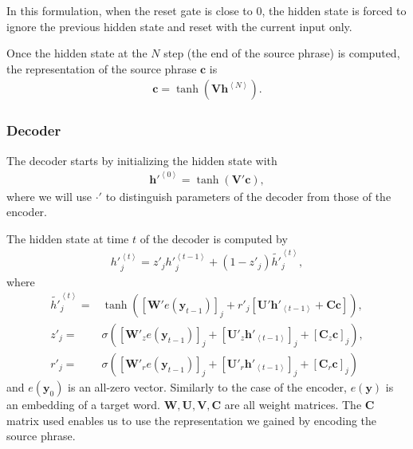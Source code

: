 \documentclass[a4paper]{article}
\newcommand{\qt}[1]{\left<#1\right>}
\newcommand{\vect}[1]{\mathbf{#1}}
\newcommand{\matr}[1]{\mathbf{#1}}
\newcommand{\vc}[0]{\vect{c}}
\newcommand{\vh}[0]{\vect{h}}
\newcommand{\vy}[0]{\vect{y}}
\newcommand{\mW}[0]{\matr{W}}
\newcommand{\mU}[0]{\matr{U}}
\newcommand{\mC}[0]{\matr{C}}
\newcommand{\mV}[0]{\matr{V}}
\begin{document}
In this formulation, when the reset gate is close to 0, the hidden state is
forced to ignore the previous hidden state and reset with the current input
only.

Once the hidden state at the $N$ step (the end of the source phrase) is computed, the representation of the source phrase
$\vc$ is
\begin{align*}
    \vc = \tanh \left( \mV \vh^{\qt{N}} \right).
\end{align*}

\subsubsection*{Decoder}

The decoder starts by initializing the hidden state with
\begin{align*}
    {\vh'}^{\qt{0}} = \tanh \left( \mV' \vc \right),
\end{align*}
where we will use $\cdot'$ to distinguish parameters of the
decoder from those of the encoder.

The hidden state at time $t$ of the decoder is computed by
\begin{align*}
    {h'}_j^{\qt{t}} = {z'}_j {h'}_j^{\qt{t-1}} +
    (1 - {z'}_j) \tilde{h'}_j^{\qt{t}},
\end{align*}
where
\begin{align*}
    \tilde{h'}_j^{\qt{t}} =& \tanh\left( 
    \left[ \mW' e(\vy_{t-1}) \right]_j + 
    {r'}_j \left[ \mU' {\vh'}_{\qt{t-1}} +
    \mC \vc 
    \right]
    \right),
    \\
    {z'}_j =& \sigma\left( \left[ {\mW'}_z e(\vy_{t-1}) \right]_j + 
    \left[{\mU'}_z {\vh'}_{\qt{t-1}}\right]_j +
    \left[\mC_z \vc \right]_j 
    \right),
    \\
    {r'}_j =& \sigma\left( \left[ {\mW'}_r e(\vy_{t-1}) \right]_j + 
    \left[{\mU'}_r {\vh'}_{\qt{t-1}}\right]_j +
    \left[ \mC_r \vc \right]_j
    \right)
\end{align*}
and $e(\vy_{0})$ is an all-zero vector. Similarly to the case of
the encoder, $e(\vy)$ is an embedding of a target word. $\mW, \mU, \mV, \mC$ are all weight matrices. The $\mC$ matrix used enables us to use the representation we gained by encoding the source phrase.
\end{document}
